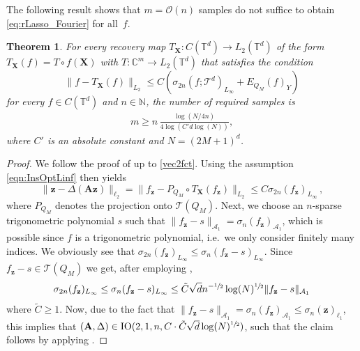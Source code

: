 \documentclass[11pt,reqno, a4paper]{article}
\numberwithin{equation}{section}
\newtheorem{theorem}{Theorem}[section]
\newcommand{\N}{\mathbb{N}}
\newcommand{\C}{\mathbb{C}}
\begin{document}
The following result shows that $m = \mathcal{O}(n)$ samples do not suffice to obtain \eqref{eq:rLasso_Fourier} for all~$f$.

\begin{theorem}
For every recovery map $T_{\mathbf{X}} \colon C(\mathbb{T}^d) \to L_2(\mathbb{T}^d)$ of the form $T_{\mathbf{X}}(f) = T \circ f(\mathbf{X})$ with $T\colon \C^m \to L_2(\mathbb{T}^d)$ that satisfies the condition
\begin{equation}\label{eqn:InsOptLinf}
\lVert f - T_{\mathbf{X}}(f) \rVert_{L_2} \leq C(\sigma_{2n}(f;\mathcal{T}^d)_{L_\infty} + E_{Q_M}(f)_Y)
\end{equation}
for every $f\in C(\mathbb{T}^d)$ and $n \in \N$, the number of required samples is
\begin{gather}
    m \geq n\, \frac{\log(N/4n)}{4\log(C'd\log(N))},
\end{gather}
where $C'$ is an absolute constant and $N=(2M+1)^d$.
\end{theorem}


\begin{proof}
We follow the proof of  up to \eqref{vec2fct}.
Using the assumption \eqref{eqn:InsOptLinf} then yields
\begin{equation}
\lVert \mathbf{z} - \Delta(\mathbf{A}\mathbf{z}) \rVert_{\ell_2} = \lVert f_{\mathbf{z}} - P_{Q_M}\circ T_{\mathbf{X}}(f_{\mathbf{z}}) \rVert_{L_2} \leq C\sigma_{2n}(f_{\mathbf{z}})_{L_\infty}\,,    
\end{equation}
where $P_{Q_M}$ denotes the projection onto $\mathcal{T}(Q_M)$.
Next, we choose an $n$-sparse trigonometric polynomial $s$ such that $\lVert f_\mathbf{z} - s \rVert_{\mathcal{A}_1} = \sigma_n(f_\mathbf{z})_{\mathcal{A}_1}$, which is possible since $f$ is a trigonometric polynomial, i.e.\ we only consider finitely many indices. We obviously see that $\sigma_{2n}(f_{\mathbf{z}})_{L_\infty} \leq \sigma_{n}(f_{\mathbf{z}}-s)_{L_\infty}$.
Since $f_\mathbf{z}-s \in \mathcal{T}(Q_M)$ we get, after employing ,
\begin{equation}
\sigma_{2n}(f_\mathbf{z})_{L_\infty} \leq \sigma_n(f_\mathbf{z}-s)_{L_\infty} \leq \tilde{C}\sqrt{d} n^{-\sfrac{1}{2}} \log(N)^{\sfrac{1}{2}} \lVert f_\mathbf{z} -s \rVert_{\mathcal{A}_1}
\end{equation}
where $\tilde{C}\geq 1$. Now, due to the fact that $\lVert f_\mathbf{z} -s \rVert_{\mathcal{A}_1} = \sigma_n(f_\mathbf{z})_{\mathcal{A}_1} \leq 
\sigma_n(\mathbf{z})_{\ell_1}$, this implies that $(\mathbf{A},\Delta)\in\operatorname{IO}(2,1,n,C\cdot\tilde{C}\sqrt{d}\log(N)^{\sfrac{1}{2}})$, such that the claim follows by applying .
\end{proof}
\end{document}
